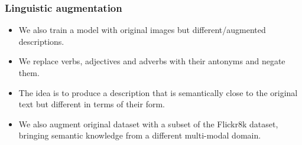 \documentclass[aspectratio=1610]{beamer} %
\newcommand{\squeezeup}{\vspace{-3mm}}
\newcommand{\squeezedown}{\vspace{2.5mm}}
\begin{document}
\begin{frame}
\frametitle{Linguistic augmentation}

\vspace{-.3cm}
\begin{figure}[htbp]
\centering
{}
  \qquad
\hspace{.5cm}

\label{fig:lingaug}
\end{figure}
\vspace{-.5cm}
\begin{itemize}

	\item We also train a model with original images but different/augmented descriptions.
	\item We replace verbs, adjectives and adverbs with their antonyms and negate them.
	\item The idea is to produce a description that is semantically close to the original text but different in terms of their form. %
	\item We also augment original dataset with a subset of the Flickr8k dataset, bringing semantic knowledge from a different multi-modal domain.

\end{itemize}
\end{frame}
\end{document}
